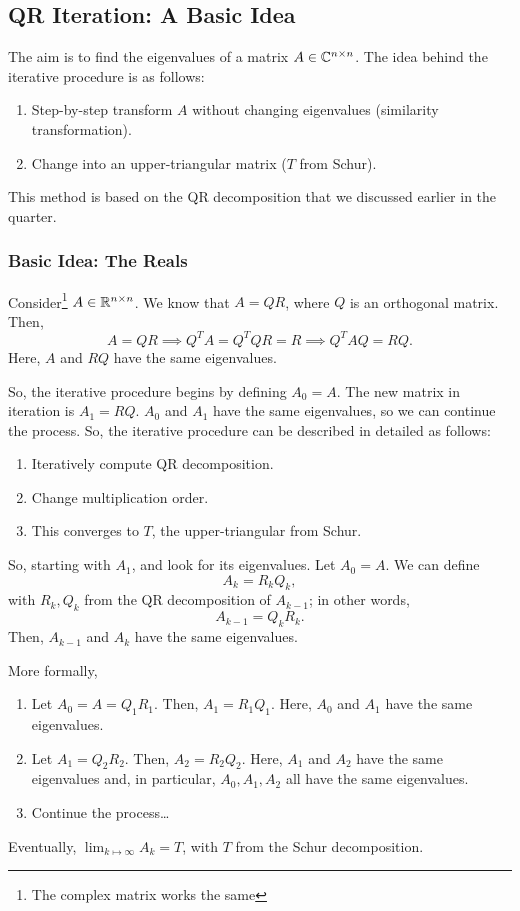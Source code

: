 \documentclass[letterpaper]{article}
\newcommand{\0}{\mathbf{0}}
\begin{document}
\subsection{QR Iteration: A Basic Idea}
The aim is to find the eigenvalues of a matrix $A \in \mathbb{C}^{n \times n}$. The idea behind the iterative procedure is as follows:
\begin{enumerate}
    \item Step-by-step transform $A$ without changing eigenvalues (similarity transformation).
    \item Change into an upper-triangular matrix ($T$ from Schur).  
\end{enumerate}
This method is based on the QR decomposition that we discussed earlier in the quarter.

\bigskip 

\subsubsection{Basic Idea: The Reals}
Consider\footnote{The complex matrix works the same} $A \in \mathbb{R}^{n \times n}$. We know that $A = QR$, where $Q$ is an orthogonal matrix. Then, 
\[A = QR \implies Q^T A = Q^T Q R = R \implies Q^T A Q = RQ.\]
Here, $A$ and $RQ$ have the same eigenvalues. 

\bigskip 

So, the iterative procedure begins by defining $A_0 = A$. The new matrix in iteration is $A_1 = RQ$. $A_0$ and $A_1$ have the same eigenvalues, so we can continue the process. So, the iterative procedure can be described in detailed as follows:
\begin{enumerate}
    \item Iteratively compute QR decomposition. 
    \item Change multiplication order. 
    \item This converges to $T$, the upper-triangular from Schur. 
\end{enumerate}
So, starting with $A_1$, and look for its eigenvalues. Let $A_0 = A$. We can define \[\boxed{A_k = R_k Q_k},\] with $R_k, Q_k$ from the QR decomposition of $A_{k - 1}$; in other words, \[\boxed{A_{k - 1} = Q_k R_k}.\] Then, $A_{k - 1}$ and $A_k$ have the same eigenvalues. 

\bigskip 

More formally, 
\begin{enumerate}
    \item Let $A_0 = A = Q_1 R_1$. Then, $A_1 = R_1 Q_1$. Here, $A_0$ and $A_1$ have the same eigenvalues. 
    \item Let $A_1 = Q_2 R_2$. Then, $A_2 = R_2 Q_2$. Here, $A_1$ and $A_2$ have the same eigenvalues and, in particular, $A_0, A_1, A_2$ all have the same eigenvalues. 
    \item Continue the process\dots
\end{enumerate}
Eventually, $\lim_{k \mapsto \infty} A_k = T$, with $T$ from the Schur decomposition. 
\end{document}
